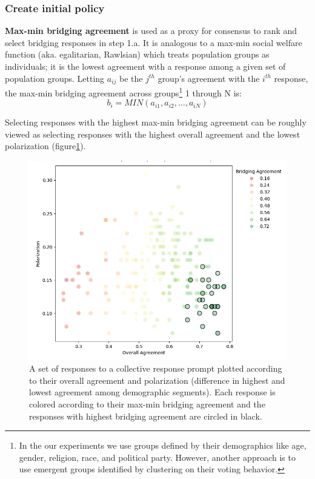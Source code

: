\documentclass{article}
\begin{document}
\subsubsection{Create initial policy}\label{A:create initial policy}

\textbf{Max-min bridging agreement} is used as a proxy for consensus to rank and select bridging responses in step 1.a. It is analogous to a max-min social welfare function (aka. egalitarian, Rawlsian) \cite{theory1971rawls} which treats population groups as individuals; it is the lowest agreement with a response among a given set of population groups. Letting  $a_{ij}$ be the $j^{th}$ group’s agreement with the $i^{th}$ response, the max-min bridging agreement across groups\footnote{In the our experiments we use groups defined by their demographics like age, gender, religion, race, and political party. However, another approach is to use emergent groups identified by clustering on their voting behavior\cite{small2021polis}.} 1 through N is: 
\begin{equation}
     b_i = MIN(a_{i1}, a_{i2}, … , a_{iN})
\end{equation}

Selecting responses with the highest max-min bridging agreement can be roughly viewed as selecting responses with the highest overall agreement and the lowest polarization (figure\ref{fig:bridging}). 

\begin{figure}[H]
\centering
  \includegraphics[width=1.0\linewidth]{figs/bridging_agreement.png}
  \caption{A set of responses to a collective response prompt plotted according to their overall agreement and polarization (difference in highest and lowest agreement among demographic segments). Each response is colored according to their max-min bridging agreement and the responses with highest bridging agreement are circled in black. }
  \label{fig:bridging}
\end{figure}
\end{document}
